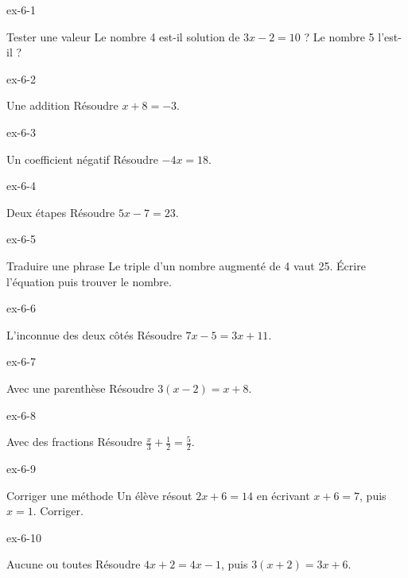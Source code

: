 \clearpage{}
\begin{blocLivre}{ex-6-1}\begin{exercice}[1]{Tester une valeur}
Le nombre 4 est-il solution de $3x-2=10$ ? Le nombre 5 l’est-il ?
\end{exercice}\end{blocLivre}
\begin{blocLivre}{ex-6-2}\begin{exercice}[1]{Une addition}
Résoudre $x+8=-3$.
\end{exercice}\end{blocLivre}
\begin{blocLivre}{ex-6-3}\begin{exercice}[1]{Un coefficient négatif}
Résoudre $-4x=18$.
\end{exercice}\end{blocLivre}
\begin{blocLivre}{ex-6-4}\begin{exercice}[1]{Deux étapes}
Résoudre $5x-7=23$.
\end{exercice}\end{blocLivre}
\begin{blocLivre}{ex-6-5}\begin{exercice}[1]{Traduire une phrase}
Le triple d’un nombre augmenté de 4 vaut 25. Écrire l’équation puis trouver le nombre.
\end{exercice}\end{blocLivre}

\begin{blocLivre}{ex-6-6}\begin{exercice}[2]{L’inconnue des deux côtés}
Résoudre $7x-5=3x+11$.
\end{exercice}\end{blocLivre}
\begin{blocLivre}{ex-6-7}\begin{exercice}[2]{Avec une parenthèse}
Résoudre $3(x-2)=x+8$.
\end{exercice}\end{blocLivre}
\begin{blocLivre}{ex-6-8}\begin{exercice}[2]{Avec des fractions}
Résoudre $\frac{x}{3}+\frac12=\frac52$.
\end{exercice}\end{blocLivre}
\begin{blocLivre}{ex-6-9}\begin{exercice}[2]{Corriger une méthode}
Un élève résout $2x+6=14$ en écrivant $x+6=7$, puis $x=1$. Corriger.
\end{exercice}\end{blocLivre}
\begin{blocLivre}{ex-6-10}\begin{exercice}[2]{Aucune ou toutes}
Résoudre $4x+2=4x-1$, puis $3(x+2)=3x+6$.
\end{exercice}\end{blocLivre}

